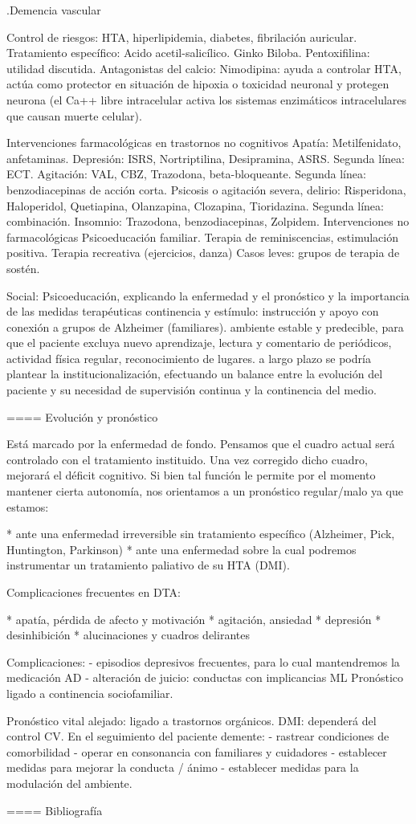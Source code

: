 \documentclass[encares.tex]{subfiles}
\begin{document}
.Demencia vascular

Control de riesgos: HTA, hiperlipidemia, diabetes, fibrilación auricular. Tratamiento específico: Acido acetil-salicílico. Ginko Biloba. Pentoxifilina: utilidad discutida. Antagonistas del calcio: Nimodipina: ayuda a controlar HTA, actúa como protector en situación de hipoxia o toxicidad neuronal y protegen neurona (el Ca++ libre intracelular activa los sistemas enzimáticos intracelulares que causan muerte celular).

Intervenciones farmacológicas en trastornos no cognitivos Apatía: Metilfenidato, anfetaminas. Depresión: ISRS, Nortriptilina, Desipramina, ASRS. Segunda línea: ECT. Agitación: VAL, CBZ, Trazodona, beta-bloqueante. Segunda línea: benzodiacepinas de acción corta. Psicosis o agitación severa, delirio: Risperidona, Haloperidol, Quetiapina, Olanzapina, Clozapina, Tioridazina. Segunda línea: combinación. Insomnio: Trazodona, benzodiacepinas, Zolpidem. Intervenciones no farmacológicas Psicoeducación familiar. Terapia de reminiscencias, estimulación positiva. Terapia recreativa (ejercicios, danza) Casos leves: grupos de terapia de sostén.

Social: Psicoeducación, explicando la enfermedad y el pronóstico y la importancia de las medidas terapéuticas continencia y estímulo: instrucción y apoyo con conexión a grupos de Alzheimer (familiares). ambiente estable y predecible, para que el paciente excluya nuevo aprendizaje, lectura y comentario de periódicos, actividad física regular, reconocimiento de lugares. a largo plazo se podría plantear la institucionalización, efectuando un balance entre la evolución del paciente y su necesidad de supervisión continua y la continencia del medio.

==== Evolución y pronóstico

Está marcado por la enfermedad de fondo. Pensamos que el cuadro actual será controlado con el tratamiento instituido. Una vez corregido dicho cuadro, mejorará el déficit cognitivo. Si bien tal función le permite por el momento mantener cierta autonomía, nos orientamos a un pronóstico regular/malo ya que estamos:

* ante una enfermedad irreversible sin tratamiento específico (Alzheimer, Pick, Huntington, Parkinson)
* ante una enfermedad sobre la cual podremos instrumentar un tratamiento paliativo de su HTA (DMI).

Complicaciones frecuentes en DTA:

* apatía, pérdida de afecto y motivación
* agitación, ansiedad
* depresión
* desinhibición
* alucinaciones y cuadros delirantes

Complicaciones: 
- episodios depresivos frecuentes, para lo cual mantendremos la medicación AD 
- alteración de juicio: conductas con implicancias ML Pronóstico ligado a continencia sociofamiliar. 

Pronóstico vital alejado: ligado a trastornos orgánicos. DMI: dependerá del control CV. En el seguimiento del paciente demente: 
- rastrear condiciones de comorbilidad 
- operar en consonancia con familiares y cuidadores 
- establecer medidas para mejorar la conducta / ánimo 
- establecer medidas para la modulación del ambiente.

==== Bibliografía
\end{document}
